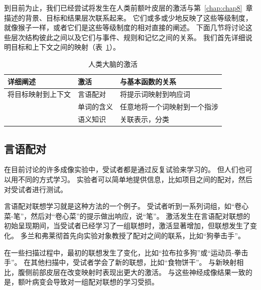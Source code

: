 到目前为止，我们已经尝试将发生在人类前额叶皮层的激活与第~\ref{chap:chap8}~章描述的背景、目标和结果层次联系起来。
它们或多或少地反映了这些等级制度，就像猴子一样，或者它们是这些等级制度的相对直接的阐述。
下面几节将讨论这些层次结构彼此之间以及它们与事件、规则和记忆之间的关系。
我们首先详细说明目标和上下文之间的映射（表~\ref{tab:9_6}）。


\begin{table}[htbp] 
	\newcommand{\tabincell}[2]{\begin{tabular}{@{}#1@{}}#2\end{tabular}} %
	\centering
	\caption{人类大脑的激活\label{tab:9_6}}
	\renewcommand\arraystretch{1.5}	%
	\begin{tabular}{lll}
		\toprule
		详细阐述 & 激活 & 与基本函数的关系\\
		\midrule
		将目标映射到上下文 & 言语配对 & 将提示词映射到响应词  \\
		& 单词的含义 & 任意地将一个词映射到一个指涉 \\
		& 语义知识 & 关联表示，分类 \\
		\bottomrule
		
	\end{tabular}%
\end{table}%



\subsection{言语配对}
\par
在目前讨论的许多成像实验中，受试者都是通过反复试验来学习的。
但人们也可以用不同的方式学习。
实验者可以简单地提供信息，比如项目之间的配对，然后对受试者进行测试。
\par


言语配对联想学习就是这种方法的一个例子。
受试者听到一系列词组，如“卷心菜-笔”，然后对“卷心菜”的提示做出响应，说“笔”。
激活发生在言语配对联想的初始呈现期间\cite{fletcher1995brain}，当受试者已经学习了一组联想时，激活显著增加，但联想发生了变化。
多兰和弗莱彻\cite{dolan1997dissociating}首先向实验对象教授了配对之间的联系，比如“狗拳击手”。
\par


在一些扫描过程中，最初的联想发生了变化，比如“拉布拉多狗”或“运动员-拳击手”。
在其他扫描中，受试者学会了新的联想，比如“食物饼干”。
与新映射相比，腹侧前部皮层在改变映射时表现出更大的激活。
与这些神经成像结果一致的是，额叶病变会导致对一组配对联想的学习受损\cite{dimitrov1999associative}。
\par


